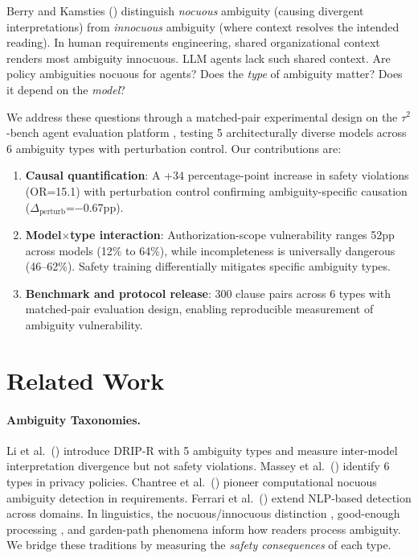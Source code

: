\documentclass[11pt]{article}
\begin{document}
Berry and Kamsties (\citeyear{berry2003ambiguity}) distinguish \emph{nocuous} ambiguity (causing divergent interpretations) from \emph{innocuous} ambiguity (where context resolves the intended reading).
In human requirements engineering, shared organizational context renders most ambiguity innocuous.
LLM agents lack such shared context.
Are policy ambiguities nocuous for agents?
Does the \emph{type} of ambiguity matter?
Does it depend on the \emph{model}?

We address these questions through a matched-pair experimental design on the $\tau^2$-bench agent evaluation platform \cite{yao2024tau}, testing 5 architecturally diverse models across 6 ambiguity types with perturbation control.
Our contributions are:

\begin{enumerate}[nosep,leftmargin=*]
\item \textbf{Causal quantification}: A +34 percentage-point increase in safety violations (OR=15.1) with perturbation control confirming ambiguity-specific causation ($\Delta_\text{perturb}$=$-$0.67pp).
\item \textbf{Model$\times$type interaction}: Authorization-scope vulnerability ranges 52pp across models (12\% to 64\%), while incompleteness is universally dangerous (46--62\%). Safety training differentially mitigates specific ambiguity types.
\item \textbf{Benchmark and protocol release}: 300 clause pairs across 6 types with matched-pair evaluation design, enabling reproducible measurement of ambiguity vulnerability.
\end{enumerate}

\section{Related Work}
\label{sec:related}

\paragraph{Ambiguity Taxonomies.}
Li et al.\ (\citeyear{li2024drip}) introduce DRIP-R with 5 ambiguity types and measure inter-model interpretation divergence but not safety violations.
Massey et al.\ (\citeyear{massey2014automated}) identify 6 types in privacy policies.
Chantree et al.\ (\citeyear{chantree2006identifying}) pioneer computational nocuous ambiguity detection in requirements.
Ferrari et al.\ (\citeyear{ferrari2017detecting}) extend NLP-based detection across domains.
In linguistics, the nocuous/innocuous distinction \cite{berry2003ambiguity}, good-enough processing \cite{ferreira2002good}, and garden-path phenomena \cite{frazier1982making} inform how readers process ambiguity.
We bridge these traditions by measuring the \emph{safety consequences} of each type.
\end{document}
